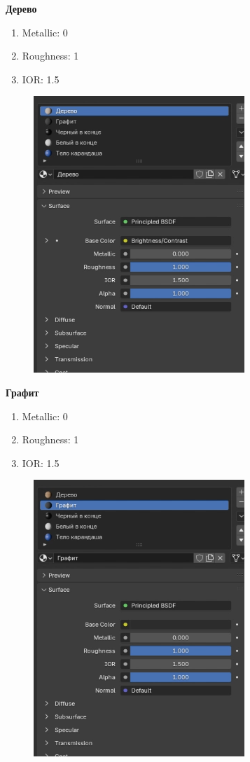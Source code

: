 \documentclass[areasetadvanced]{scrartcl}
\begin{document}
\par \textbf{Дерево}
\begin{enumerate}
    \item Metallic: 0
    \item Roughness: 1
    \item IOR: 1.5
\end{enumerate}

\begin{figure}[H]
    \label{4} 
    \centering
    \includegraphics[width=0.4\linewidth]{pen/15.png}
\end{figure}

\par \textbf{Графит}
\begin{enumerate}
    \item Metallic: 0
    \item Roughness: 1
    \item IOR: 1.5
\end{enumerate}

\begin{figure}[H]
    \label{4} 
    \centering
    \includegraphics[width=0.4\linewidth]{pen/16.png}
\end{figure}
\end{document}
